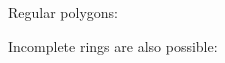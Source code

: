 \documentclass{article}
\begin{document}
	
	Regular polygons:
	
	
	Incomplete rings are also possible:
	
	
\end{document}
